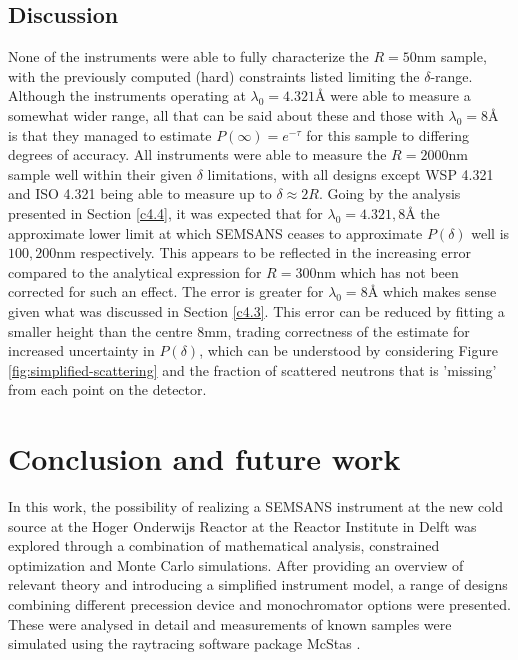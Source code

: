 \documentclass{article}
\begin{document}
\subsection{Discussion}
None of the instruments were able to fully characterize the $R=50\unit{\nano\meter}$ sample, with the previously computed (hard) constraints listed limiting the $\delta$-range. Although the instruments operating at $\lambda_0 = 4.321$Å were able to measure a somewhat wider range, all that can be said about these and those with $\lambda_0 = 8$Å is that they managed to estimate $P(\infty) = e^{-\tau}$ for this sample to differing degrees of accuracy. All instruments were able to measure the $R = 2000 \unit{\nano\meter}$ sample well within their given $\delta$ limitations, with all designs except WSP 4.321 and ISO 4.321 being able to measure up to $\delta \approx 2R$. Going by the analysis presented in Section \ref{c4.4}, it was expected that for $\lambda_0 = 4.321, 8$Å the approximate lower limit at which SEMSANS ceases to approximate $P(\delta)$ well is $100, 200\unit{\nano\meter}$ respectively. This appears to be reflected in the increasing error compared to the analytical expression for $R = 300\unit{\nano\meter}$ which has not been corrected for such an effect. The error is greater for $\lambda_0 = 8$Å which makes sense given what was discussed in Section \ref{c4.3}. This error can be reduced by fitting a smaller height than the centre $8\unit{\milli\meter}$, trading correctness of the estimate for increased uncertainty in $P(\delta)$, which can be understood by considering Figure \ref{fig:simplified-scattering} and the fraction of scattered neutrons that is 'missing' from each point on the detector. 


\newpage
\section{Conclusion and future work}
In this work, the possibility of realizing a SEMSANS instrument at the new cold source at the Hoger Onderwijs Reactor at the Reactor Institute in Delft was explored through a combination of mathematical analysis, constrained optimization and Monte Carlo simulations. After providing an overview of relevant theory and introducing a simplified instrument model, a range of designs combining different precession device and monochromator options were presented. These were analysed in detail and measurements of known samples were simulated using the raytracing software package McStas \cite{willendrup2020}. 
\end{document}
